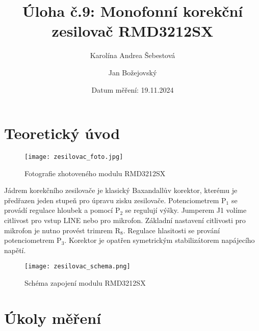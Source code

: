 \documentclass[a4paper, czech]{article}
\title{Úloha č.9: Monofonní korekční zesilovač RMD3212SX}
\author{Karolína Andrea Šebestová \and Jan Božejovský}
\date{Datum měření: 19.11.2024}
\begin{document}
\maketitle

\section{Teoretický úvod}

\begin{figure}[H]
    \centering
    \texttt{[image: zesilovac\_foto.jpg]}
    \caption{Fotografie zhotoveného modulu RMD3212SX}
\end{figure}

Jádrem korekčního zesilovače je klasický Baxandallův korektor, kterému je předřazen
jeden stupeň pro úpravu zisku zesilovače.
Potenciometrem $\text{P}_1$ se provádí regulace hloubek a pomocí $\text{P}_2$ se
regulují výšky.
Jumperem J1 volíme citlivost pro vstup LINE nebo pro mikrofon.
Základní nastavení citlivosti pro mikrofon je nutno provést trimrem $\text{R}_8$.
Regulace hlasitosti se prování potenciometrem $\text{P}_3$.
Korektor je opatřen symetrickým stabilizátorem napájecího napětí.

\begin{figure}[H]
    \centering
    \texttt{[image: zesilovac\_schema.png]}
    \caption{Schéma zapojení modulu RMD3212SX}
\end{figure}

\section{Úkoly měření}
\end{document}
